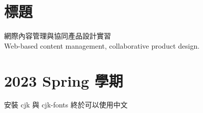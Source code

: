 \documentclass[book, oneside, 12pt]{article}
\begin{document}
\begin{CJK*}{UTF8}{bsmi}
 
\section{標題}
網際內容管理與協同產品設計實習 \\[18pt] %
Web-based content management, collaborative product design.
 
\section{2023 Spring 學期}
安裝 cjk 與 cjk-fonts 終於可以使用中文
 
\end{CJK*}
\end{document}
